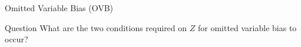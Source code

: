 \documentclass[notes,10pt, aspectratio=169]{beamer}
\begin{document}
\begin{frame}{Omitted Variable Bias (OVB)}
\begin{exampleblock}{Question}
    What are the two conditions required on $Z$ for omitted variable bias to occur?
\end{exampleblock}

\vspace{1cm}
\begin{center}
\begin{figure}
\end{figure}
\end{center}
\end{frame}
\end{document}
